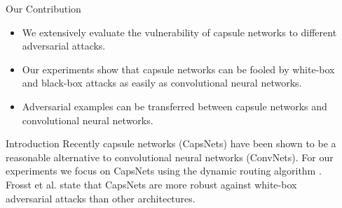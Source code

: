 \documentclass[final]{beamer}
\newlength{\sepwid}
\newlength{\onecolwid}
\begin{document}
	\begin{frame}[t] %
	
	\begin{columns}[t] %
		
		\begin{column}{\sepwid}\end{column} %
		
		\begin{column}{\onecolwid} %
			
			\begin{alertblock}{Our Contribution}
				
				\begin{itemize}
					\item We extensively evaluate the vulnerability of capsule networks to different adversarial attacks.
					\item Our experiments show that capsule networks can be fooled by white-box and black-box attacks as easily as convolutional neural networks.
					\item Adversarial examples can be transferred between capsule networks and convolutional neural networks.
				\end{itemize}
				
			\end{alertblock}
			
			\begin{block}{Introduction}
				Recently capsule networks (CapsNets) \cite{capsules}
				have been shown to be a reasonable alternative to convolutional neural
				networks (ConvNets). For our experiments we focus on CapsNets using the dynamic routing algorithm \cite{capsules}. Frosst et al. \cite{darccc} state that CapsNets
				are more robust against white-box adversarial attacks than other
				architectures. 
			\end{block}
		

\end{column}
\end{columns}
\end{frame}
\end{document}
